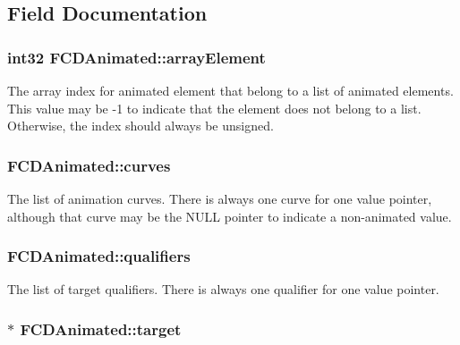 \subsection{Field Documentation}
\hypertarget{classFCDAnimated_a27daa356d592abe62b5f84871bb6fefc}{
\subsubsection[{arrayElement}]{\setlength{\rightskip}{0pt plus 5cm}int32 {\bf FCDAnimated::arrayElement}}}
\label{classFCDAnimated_a27daa356d592abe62b5f84871bb6fefc}
The array index for animated element that belong to a list of animated elements. This value may be -\/1 to indicate that the element does not belong to a list. Otherwise, the index should always be unsigned. \hypertarget{classFCDAnimated_a602e65dada6111b6b748555550c0cb18}{
\subsubsection[{curves}]{ {\bf FCDAnimated::curves}}}
\label{classFCDAnimated_a602e65dada6111b6b748555550c0cb18}
The list of animation curves. There is always one curve for one value pointer, although that curve may be the NULL pointer to indicate a non-\/animated value. \hypertarget{classFCDAnimated_a02ab9175d25055cd2d10d924de312490}{
\subsubsection[{qualifiers}]{ {\bf FCDAnimated::qualifiers}}}
\label{classFCDAnimated_a02ab9175d25055cd2d10d924de312490}
The list of target qualifiers. There is always one qualifier for one value pointer. \hypertarget{classFCDAnimated_aca46cbdc7ee7a1b4cf90a5aa6849f4e0}{
\subsubsection[{target}]{$\ast$ {\bf FCDAnimated::target}}}
